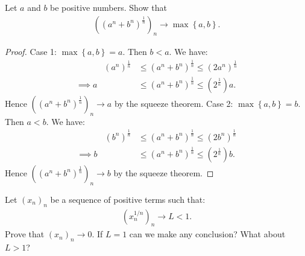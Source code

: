 \documentclass[10pt,twoside,openany]{memoir}
\begin{document}
    \begin{exercise}
        Let $a$ and $b$ be positive numbers. Show that
            \begin{equation*}
            \begin{split}
                \left((a^n+b^n)^\frac{1}{n}\right)_n \rightarrow \max \left\{a,b\right\}.
            \end{split}
            \end{equation*}
    \end{exercise}
        \begin{proof}
            Case 1: $\max \left\{a,b\right\} = a$. Then $b < a$. We have:
                \begin{equation*}
                \begin{split}
                    \phantom{implies}(a^n)^\frac{1}{n} &\leq (a^n+b^n)^\frac{1}{n} \leq (2a^n)^\frac{1}{n} \\
                    \implies a &\leq (a^n+b^n)^\frac{1}{n} \leq (2^\frac{1}{n})a.
                \end{split}
                \end{equation*}
            Hence $\left((a^n + b^n)^\frac{1}{n}\right)_n \rightarrow a$ by the squeeze theorem. Case 2: $\max \left\{a,b\right\} = b$. Then $a < b$. We have:
                \begin{equation*}
                \begin{split}
                    \phantom{implies}(b^n)^\frac{1}{n} &\leq (a^n+b^n)^\frac{1}{n} \leq (2b^n)^\frac{1}{n} \\
                    \implies b &\leq (a^n+b^n)^\frac{1}{n} \leq (2^\frac{1}{n})b.
                \end{split}
                \end{equation*}
            Hence $\left((a^n + b^n)^\frac{1}{n}\right)_n \rightarrow b$ by the squeeze theorem.
        \end{proof}
        \begin{exercise}
            Let $(x_n)_n$ be a sequence of positive terms such that:
                \begin{equation*}
                \begin{split}
                    (x_n^{1/n})_n \rightarrow L <1.
                \end{split}
                \end{equation*}
            Prove that $(x_n)_n \rightarrow 0 $. If $L = 1$ can we make any conclusion? What about $L > 1$?
        \end{exercise}
\end{document}
